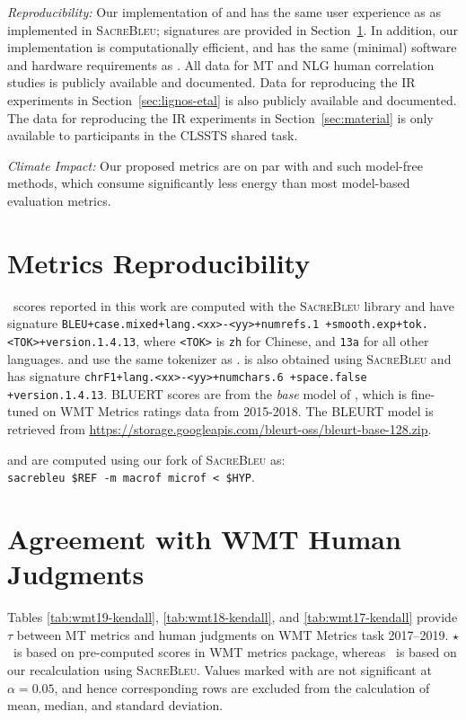 \textit{Reproducibility:}
Our implementation of  and  has the same user experience as \bleu{} as implemented in \textsc{SacreBleu}; signatures are provided in Section~\ref{sec:appmetrics}. 
In addition, our implementation is  computationally efficient, and has the same (minimal) software and hardware requirements as \bleu{}. 
 All data for MT and NLG human correlation studies is publicly available and documented. Data for reproducing the IR experiments in Section~\ref{sec:lignos-etal} is also publicly available and documented. The data for reproducing the IR experiments in Section~\ref{sec:material} is only available to participants in the CLSSTS shared task. 

\textit{Climate Impact:} Our proposed metrics are on par with \bleu{} and such model-free methods, which consume significantly less energy than most model-based evaluation metrics.



\section{Metrics Reproducibility}
\label{sec:appmetrics}

\bleu\ scores reported in this work are computed with the \textsc{SacreBleu} library and have signature \texttt{\small BLEU+case.mixed+lang.<xx>-<yy>+numrefs.1 +smooth.exp+tok.<TOK>+version.1.4.13}, where \texttt{<TOK>} is \texttt{zh} for Chinese, and \texttt{13a} for all other languages.  and  use the same tokenizer as \bleu.
 is also obtained using \textsc{SacreBleu} and has signature \texttt{\small chrF1+lang.<xx>-<yy>+numchars.6 +space.false +version.1.4.13}.
BLUERT scores are from the \textit{base} model of \citet{sellam-etal-2020-bleurt}, which is fine-tuned on WMT Metrics ratings data from 2015-2018.
The BLEURT model is retrieved from \url{https://storage.googleapis.com/bleurt-oss/bleurt-base-128.zip}.

 and  are computed using our fork of \textsc{SacreBleu} as:\\
\texttt{sacrebleu \$REF -m macrof microf < \$HYP}.


\section{Agreement with WMT Human Judgments}
\label{sec:apphuman}

Tables \ref{tab:wmt19-kendall}, \ref{tab:wmt18-kendall}, and \ref{tab:wmt17-kendall} provide $\tau$ between MT metrics and human judgments on WMT Metrics task 2017--2019. 
$\star$\bleu\ is based on pre-computed scores in WMT metrics package, whereas \bleu\ is based on our recalculation using \textsc{SacreBleu}. 
Values marked with \insig are not significant at $\alpha=0.05$, and hence corresponding rows are excluded from the calculation of mean, median, and standard deviation.

